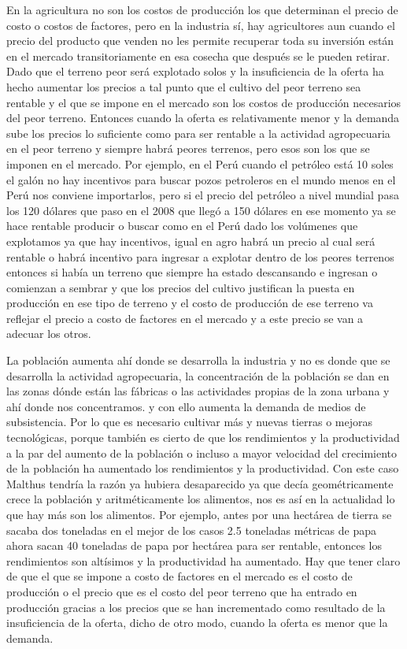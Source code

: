 \documentclass[
  letterpaper,
  DIV=11,
  numbers=noendperiod]{scrartcl}
\begin{document}
En la agricultura no son los costos de producción los que determinan el
precio de costo o costos de factores, pero en la industria sí, hay
agricultores aun cuando el precio del producto que venden no les permite
recuperar toda su inversión están en el mercado transitoriamente en esa
cosecha que después se le pueden retirar. Dado que el terreno peor será
explotado solos y la insuficiencia de la oferta ha hecho aumentar los
precios a tal punto que el cultivo del peor terreno sea rentable y el
que se impone en el mercado son los costos de producción necesarios del
peor terreno. Entonces cuando la oferta es relativamente menor y la
demanda sube los precios lo suficiente como para ser rentable a la
actividad agropecuaria en el peor terreno y siempre habrá peores
terrenos, pero esos son los que se imponen en el mercado. Por ejemplo,
en el Perú cuando el petróleo está 10 soles el galón no hay incentivos
para buscar pozos petroleros en el mundo menos en el Perú nos conviene
importarlos, pero si el precio del petróleo a nivel mundial pasa los 120
dólares que paso en el 2008 que llegó a 150 dólares en ese momento ya se
hace rentable producir o buscar como en el Perú dado los volúmenes que
explotamos ya que hay incentivos, igual en agro habrá un precio al cual
será rentable o habrá incentivo para ingresar a explotar dentro de los
peores terrenos entonces si había un terreno que siempre ha estado
descansando e ingresan o comienzan a sembrar y que los precios del
cultivo justifican la puesta en producción en ese tipo de terreno y el
costo de producción de ese terreno va reflejar el precio a costo de
factores en el mercado y a este precio se van a adecuar los otros.

La población aumenta ahí donde se desarrolla la industria y no es donde
que se desarrolla la actividad agropecuaria, la concentración de la
población se dan en las zonas dónde están las fábricas o las actividades
propias de la zona urbana y ahí donde nos concentramos. y con ello
aumenta la demanda de medios de subsistencia. Por lo que es necesario
cultivar más y nuevas tierras o mejoras tecnológicas, porque también es
cierto de que los rendimientos y la productividad a la par del aumento
de la población o incluso a mayor velocidad del crecimiento de la
población ha aumentado los rendimientos y la productividad. Con este
caso Malthus tendría la razón ya hubiera desaparecido ya que decía
geométricamente crece la población y aritméticamente los alimentos, nos
es así en la actualidad lo que hay más son los alimentos. Por ejemplo,
antes por una hectárea de tierra se sacaba dos toneladas en el mejor de
los casos 2.5 toneladas métricas de papa ahora sacan 40 toneladas de
papa por hectárea para ser rentable, entonces los rendimientos son
altísimos y la productividad ha aumentado. Hay que tener claro de que el
que se impone a costo de factores en el mercado es el costo de
producción o el precio que es el costo del peor terreno que ha entrado
en producción gracias a los precios que se han incrementado como
resultado de la insuficiencia de la oferta, dicho de otro modo, cuando
la oferta es menor que la demanda.
\end{document}
